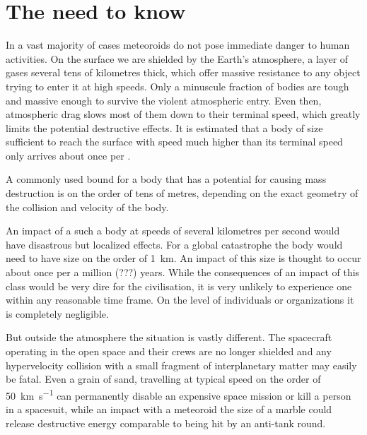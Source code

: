
\section{The need to know} \label{in}
    In a vast majority of cases meteoroids do not pose immediate danger to human activities.
    On the surface we are shielded by the Earth's atmosphere, a layer of gases several tens of kilometres
    thick, which offer massive resistance to any object trying to enter it at high speeds.
    Only a minuscule fraction of bodies are tough and massive enough to survive the violent atmospheric entry.
    Even then, atmospheric drag slows most of them down to their terminal speed, which greatly limits the potential destructive effects.
    It is estimated that a body of size sufficient to reach the surface with speed much higher than its terminal speed
    only arrives about once per .

    A commonly used bound for a body that has a potential for causing mass destruction is on the order of tens of metres,
    depending on the exact geometry of the collision and velocity of the body.

    An impact of a such a body at speeds of several kilometres per second would have disastrous but localized effects.
    For a global catastrophe the body would need to have size on the order
    of \SI{1}{\kilo\metre}. An impact of this size is thought to occur about once per a million (???) years. 
    While the consequences of an impact of this class would be very dire for the civilisation,
    it is very unlikely to experience one within any reasonable time frame.
    On the level of individuals or organizations it is completely negligible.

    But outside the atmosphere the situation is vastly different.
    The spacecraft operating in the open space and their crews are no longer shielded
    and any hypervelocity collision with a small fragment of interplanetary matter may easily be fatal.
    Even a grain of sand, travelling at typical speed on the order of \SI{50}{\kilo\metre\per\second} can permanently disable
    an expensive space mission or kill a person in a spacesuit,
    while an impact with a meteoroid the size of a marble could release
    destructive energy comparable to being hit by an anti-tank round.

